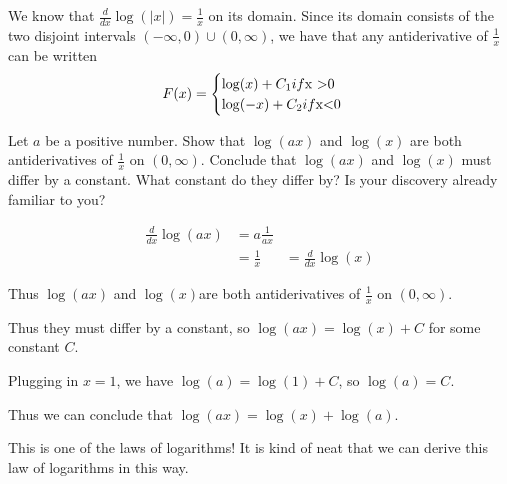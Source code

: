 \documentclass{ximera}
\begin{document}
	\begin{example}
		We know that $\frac{d}{dx} \log( |x |) =  \frac{1}{x}$ on its domain.   Since its domain consists of the two disjoint intervals $(-\infty,0) \cup (0,\infty)$, we have that any antiderivative of $\frac{1}{x}$ can be written 
		\[
		F(x) = \begin{cases}
			\log(x)+C_1 if $x >0$\\
			\log(-x)+C_2 if $x<0$
		\end{cases}
		\]
	\end{example}
	
	\begin{question}
		Let $a$ be a positive number.  Show that $\log(ax)$ and $\log(x)$ are both antiderivatives of $\frac{1}{x}$ on $(0,\infty)$.  Conclude that $\log(ax)$ and $\log(x)$ must differ by a constant.  What constant do they differ by?  Is your discovery already familiar to you?
		
		\begin{free-response}
			\begin{align*}
				\frac{d}{dx} \log(ax) &= a\frac{1}{ax}\\
				&=\frac{1}{x}
				&=\frac{d}{dx} \log(x)
			\end{align*}
			
			Thus $\log(ax)$ and $\log(x)$are both antiderivatives of $\frac{1}{x}$ on $(0,\infty)$.
			
			Thus they must differ by a constant, so $\log(ax) = \log(x)+C$ for some constant $C$.
			
			Plugging in $x=1$, we have $\log(a) = \log(1)+C$, so $\log(a) = C$.
			
			Thus we can conclude that $\log(ax) = \log(x)+\log(a)$.
			
			This is one of the laws of logarithms!  It is kind of neat that we can derive this law of logarithms in this way.
			
		\end{free-response}
	\end{question}
	
	
\end{document}
